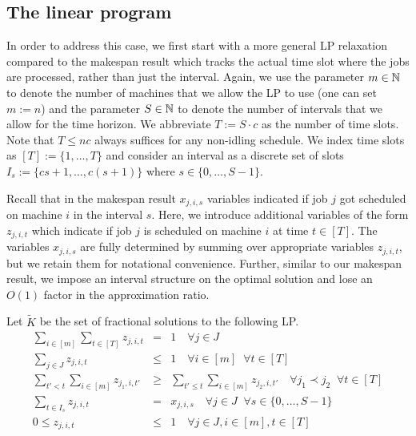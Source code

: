 \subsection{The linear program}
In order to address this case, we first start with a more general  LP relaxation compared to the makespan result
which tracks the actual time slot where the jobs are processed, rather than just the interval.
Again, we use the parameter $m \in \mathbb{N}$ to denote the number of machines that we allow the LP to use (one can set $m := n$)
and the parameter $S \in \mathbb{N}$ to denote the number of intervals that we allow for the time horizon. We abbreviate $T := S \cdot c$ as the number of
time slots. Note that $T \leq nc$ always suffices for any non-idling schedule. We index time slots as $[T] := \{ 1,\ldots,T\}$
and consider an interval as a discrete set of slots $I_s := \{ cs+1,\ldots,c(s+1)\}$ where $s \in \{ 0,\ldots,S-1\}$.

Recall that in the makespan result $x_{j,i,s}$ variables indicated if job $j$ got scheduled on machine $i$ in the interval $s$. %
Here, we introduce additional variables of the form $z_{j,i,t}$ which indicate if job $j$ is scheduled on machine $i$ at time $t \in [T]$.
The variables $x_{j,i,s}$ are fully determined by summing over appropriate variables $z_{j,i,t}$, but we retain
them for  notational convenience.
Further, similar to our makespan result, we  impose an interval structure on the optimal solution and lose an $O(1)$ factor in the approximation ratio.



Let $\tilde{K}$ be the set of fractional solutions to the following LP.
\begin{eqnarray*}
  \sum_{i \in [m]} \sum_{t \in [T]} z_{j,i,t} &=& 1 \quad \forall j \in J \\
  \sum_{j \in J} z_{j,i,t} &\leq& 1 \quad \forall i \in [m] \;\; \forall t \in [T] \\
  \sum_{t' < t} \sum_{i \in [m]} z_{j_1,i,t'} &\geq& \sum_{t' \leq t} \sum_{i \in [m]} z_{j_2,i,t'} \quad \forall j_1 \prec j_2 \;\;\forall t \in [T] \\
   \sum_{t \in I_s} z_{j,i,t} &=& x_{j,i,s} \quad \forall j \in J \;\; \forall s \in \{ 0,\ldots,S-1\} \\
  0 \leq z_{j,i,t} &\leq& 1 \quad \forall j \in J, i \in [m], t \in [T] \\
\end{eqnarray*}

